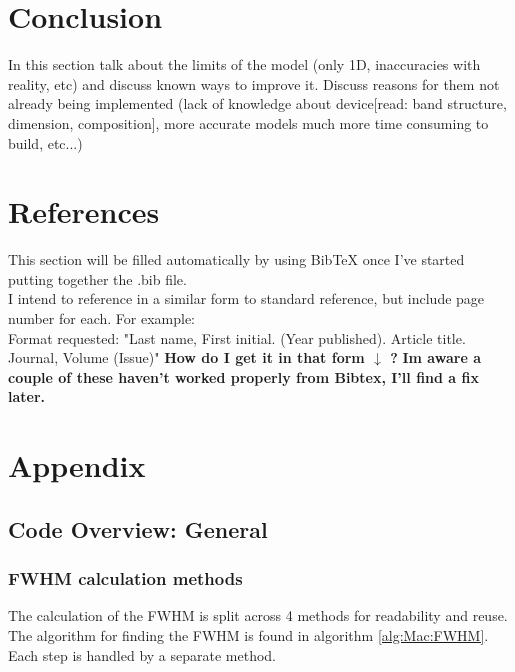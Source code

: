\documentclass[titlepage]{article}
\begin{document}
\section{Conclusion}
In this section talk about the limits of the model (only 1D, inaccuracies with reality, etc) and discuss known ways to improve it. Discuss reasons for them not already being implemented (lack of knowledge about device[read: band structure, dimension, composition], more accurate models much more time consuming to build, etc...) \\


\section{References}
This section will be filled automatically by using BibTeX once I've started putting together the .bib file.\\
I intend to reference in a similar form to standard reference, but include page number for each. For example:\\
\medbreak
Format requested: "Last name, First initial. (Year published). Article title. Journal, Volume (Issue)" \textbf{How do I get it in that form $\downarrow$ ?} \textbf{Im aware a couple of these haven't worked properly from Bibtex, I'll find a fix later.}
{}

\bigskip

\section{Appendix}
\subsection{Code Overview: General}
\subsubsection{FWHM calculation methods}
The calculation of the FWHM is split across 4 methods for readability and reuse. The algorithm for finding the FWHM is found in algorithm \ref{alg:Mac:FWHM}. Each step is handled by a separate method.
\end{document}
